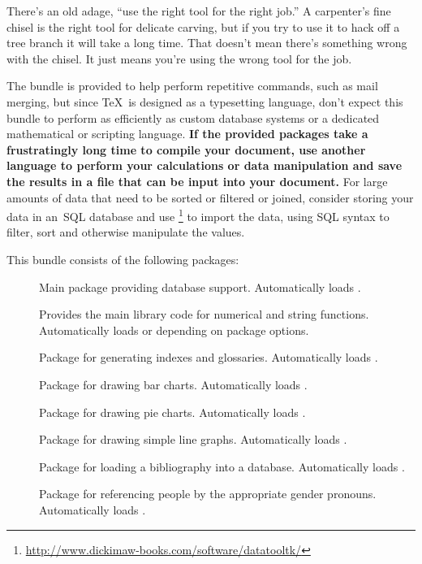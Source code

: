 \documentclass[report,widecs]{nlctdoc}
\begin{document}
\begin{important}
There's an old adage, ``use the right tool for the right job.''
A carpenter's fine chisel is the right tool for delicate carving,
but if you try to use it to hack off a tree branch it will take a
long time. That doesn't mean there's something wrong with the
chisel. It just means you're using the wrong tool for the job.

The  bundle is provided to help perform repetitive
commands, such as mail merging, but since \TeX\ is designed as a
typesetting language, don't expect this bundle to perform as
efficiently as custom database systems or a dedicated mathematical
or scripting language. \textbf{If the provided packages take a frustratingly
long time to compile your document, use another language to perform
your calculations or data manipulation and save the results in a
file that can be input into your document.} For large amounts of
data that need to be sorted or filtered or joined, consider storing your data 
in an~SQL database and use
\footnote{\url{http://www.dickimaw-books.com/software/datatooltk/}} to import the data, 
using SQL syntax to filter, sort and otherwise
manipulate the values.
\end{important}

This bundle consists of the following packages:
\begin{description}
\item[] Main package providing database support.
Automatically loads .

\item[] Provides the main library code for
numerical and string functions. Automatically
loads  or  depending on
package options.

\item[] Package for generating indexes and glossaries.
Automatically loads .

\item[] Package for drawing bar charts.
Automatically loads .

\item[] Package for drawing pie charts.
Automatically loads .

\item[] Package for drawing simple line graphs.
Automatically loads .

\item[] Package for loading a bibliography into a
database. Automatically loads .

\item[] Package for referencing people by the
appropriate gender pronouns. Automatically loads .

\end{description}
\end{document}
